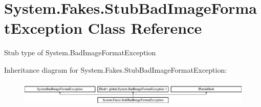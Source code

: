 \hypertarget{class_system_1_1_fakes_1_1_stub_bad_image_format_exception}{\section{System.\-Fakes.\-Stub\-Bad\-Image\-Format\-Exception Class Reference}
\label{class_system_1_1_fakes_1_1_stub_bad_image_format_exception}
}


Stub type of System.\-Bad\-Image\-Format\-Exception 


Inheritance diagram for System.\-Fakes.\-Stub\-Bad\-Image\-Format\-Exception\-:\begin{figure}[H]
\begin{center}
\leavevmode
\includegraphics[height=1.232123cm]{class_system_1_1_fakes_1_1_stub_bad_image_format_exception}
\end{center}
\end{figure}
